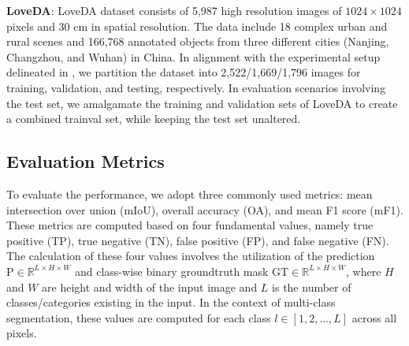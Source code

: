 \documentclass[journal]{IEEEtran}
\begin{document}
\noindent\textbf{LoveDA}: LoveDA dataset \cite{wang2021loveda} consists of 5,987 high resolution images of $1024 \times 1024$ pixels and $30$ cm in spatial resolution. The data include 18 complex urban and rural scenes and 166,768 annotated objects from three different cities (Nanjing, Changzhou, and Wuhan) in China. 
In alignment with the experimental setup delineated in \cite{wang2021loveda}, we partition the dataset into 2,522/1,669/1,796 images for training, validation, and testing, respectively. In evaluation scenarios involving the test set, we amalgamate the training and validation sets of LoveDA to create a combined trainval set, while keeping the test set unaltered.

\subsection{Evaluation Metrics}
To evaluate the performance, we adopt three commonly used metrics: mean intersection over union (mIoU), overall accuracy (OA), and mean F1 score (mF1). 
These metrics are computed based on four fundamental values, namely true positive (TP), true negative (TN), false positive (FP), and false negative (FN). 
The calculation of these four values involves the utilization of the prediction $\text{P}\in \mathbb{R}^{L \times H\times W}$ and class-wise binary groundtruth mask $\text{GT}\in \mathbb{R}^{L \times H\times W}$, where $H$ and $W$ are height and width of the input image and $L$ is the number of classes/categories existing in the input. In the context of multi-class segmentation, these values are computed for each class $l \in [1, 2, ..., L]$ across all pixels.
\end{document}
